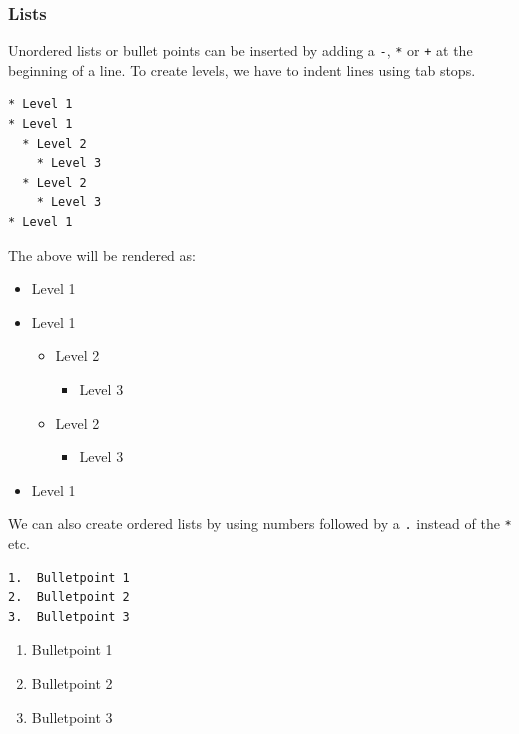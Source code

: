 \documentclass[
]{book}
\providecommand{\tightlist}{%
  \setlength{\itemsep}{0pt}\setlength{\parskip}{0pt}}
\begin{document}
\hypertarget{lists}{%
\subsubsection{Lists}\label{lists}}

Unordered lists or bullet points can be inserted by adding a \texttt{-}, \texttt{*} or \texttt{+} at the beginning of a line. To create levels, we have to indent lines using tab stops.

\begin{verbatim}
* Level 1
* Level 1
  * Level 2
    * Level 3
  * Level 2
    * Level 3
* Level 1
\end{verbatim}

The above will be rendered as:

\begin{itemize}
\tightlist
\item
  Level 1
\item
  Level 1

  \begin{itemize}
  \tightlist
  \item
    Level 2

    \begin{itemize}
    \tightlist
    \item
      Level 3
    \end{itemize}
  \item
    Level 2

    \begin{itemize}
    \tightlist
    \item
      Level 3
    \end{itemize}
  \end{itemize}
\item
  Level 1
\end{itemize}

We can also create ordered lists by using numbers followed by a \texttt{.} instead of the \texttt{*} etc.

\begin{verbatim}
1.  Bulletpoint 1
2.  Bulletpoint 2
3.  Bulletpoint 3
\end{verbatim}

\begin{enumerate}
\def\labelenumi{\arabic{enumi}.}
\tightlist
\item
  Bulletpoint 1
\item
  Bulletpoint 2
\item
  Bulletpoint 3
\end{enumerate}
\end{document}
